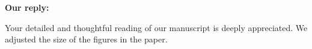 \documentclass{article}
\begin{document}
\begin{flushleft}
  \textbf{Our reply:}
\end{flushleft}
\begin{adjustwidth}{1cm}{1cm}  %
    Your detailed and thoughtful reading of our manuscript is deeply appreciated. We adjusted the size of the figures in the paper.
\end{adjustwidth}

\end{document}
